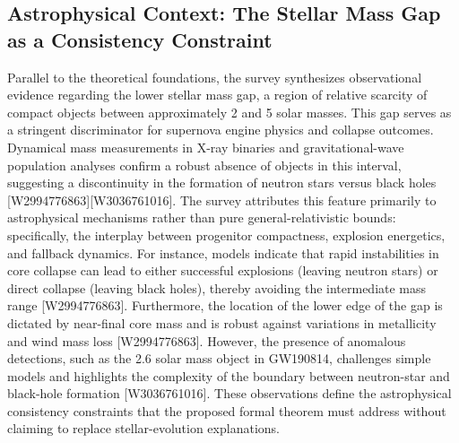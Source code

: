\documentclass[conference]{IEEEtran}
\begin{document}
\subsection{Astrophysical Context: The Stellar Mass Gap as a Consistency Constraint}
Parallel to the theoretical foundations, the survey synthesizes observational evidence regarding the lower stellar mass gap, a region of relative scarcity of compact objects between approximately 2 and 5 solar masses. This gap serves as a stringent discriminator for supernova engine physics and collapse outcomes. Dynamical mass measurements in X-ray binaries and gravitational-wave population analyses confirm a robust absence of objects in this interval, suggesting a discontinuity in the formation of neutron stars versus black holes [W2994776863][W3036761016]. The survey attributes this feature primarily to astrophysical mechanisms rather than pure general-relativistic bounds: specifically, the interplay between progenitor compactness, explosion energetics, and fallback dynamics. For instance, models indicate that rapid instabilities in core collapse can lead to either successful explosions (leaving neutron stars) or direct collapse (leaving black holes), thereby avoiding the intermediate mass range [W2994776863]. Furthermore, the location of the lower edge of the gap is dictated by near-final core mass and is robust against variations in metallicity and wind mass loss [W2994776863]. However, the presence of anomalous detections, such as the 2.6 solar mass object in GW190814, challenges simple models and highlights the complexity of the boundary between neutron-star and black-hole formation [W3036761016]. These observations define the astrophysical consistency constraints that the proposed formal theorem must address without claiming to replace stellar-evolution explanations.~\cite{cite_7a407c865faafd11}
\end{document}
